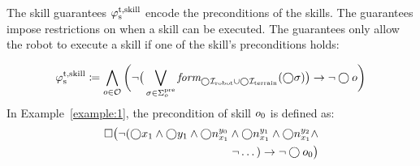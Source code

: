 \documentclass[letterpaper, 10 pt, conference]{ieeeconf}
\begin{document}
The skill guarantees $\varphi_\textrm{s}^\textrm{t,skill}$ encode the preconditions of the skills.
The guarantees impose restrictions on when a skill can be executed.
The guarantees only allow the robot to execute a skill 
if one of the skill's preconditions holds:

\begin{equation}\label{eq:sys_trans}
\begin{aligned}
    \varphi_\textrm{s}^\textrm{t,skill} \coloneqq 
    \bigwedge_{o \in \mathcal{O}} \bigg(
    \neg \big(
    \bigvee_{\sigma\in\Sigma_{o}^{\textrm{pre}}}
    \textit{form}_{\bigcirc{\mathcal I}_{\textrm{robot}}\cup\bigcirc{\mathcal I}_{\textrm{terrain}}}(\bigcirc\sigma)
    \big)
    \to \neg \bigcirc o
    \bigg)
\end{aligned}
\end{equation}
%
In Example~\ref{example:1}, the precondition of skill $o_{0}$ is defined as:
\begin{equation}
\begin{aligned}
     \square \big( \neg 
     (
     \bigcirc x_1 \land 
     \bigcirc y_1 \land 
     \bigcirc n_{x_1}^{y_0} \land 
     \bigcirc n_{x_1}^{y_1} \land 
     \bigcirc n_{x_1}^{y_2}\land \\
     \neg \dots)
     \to \neg \bigcirc o_{0} \big)
\end{aligned}
\end{equation}
\end{document}

